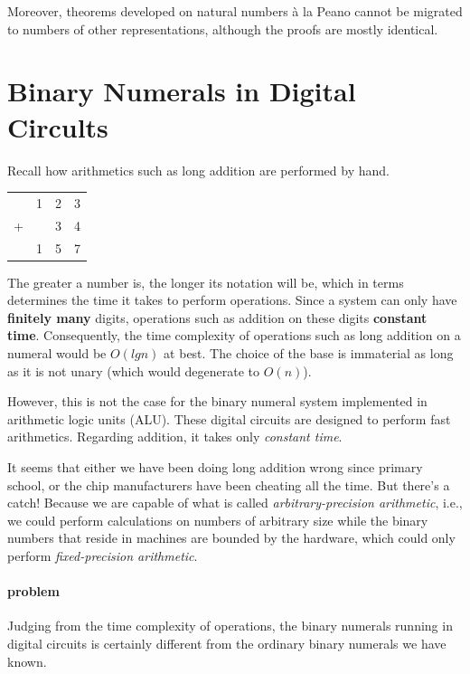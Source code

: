 \documentclass[\main/thesis.tex]{subfiles}
\begin{document}
Moreover, theorems developed on natural numbers à la Peano cannot be migrated
to numbers of other representations, although the proofs are mostly identical.

\section{Binary Numerals in Digital Circults}

Recall how arithmetics such as long addition are performed by hand.

\begin{center}
    \begin{tabular}{c@{\,}c@{\,}c@{\,}c}
      & 1 & 2 & 3 \\
    + &   & 3 & 4 \\
    \hline
      & 1 & 5 & 7 \\
    \end{tabular}
\end{center}
The greater a number is, the longer its notation will be, which in terms
determines the time it takes to perform operations.
Since a system can only have \textbf{finitely many} digits, operations such as
addition on these digits 
\textbf{constant time}.
Consequently, the time complexity of operations such as long addition on a
numeral would be $ O(lg n) $ at best.
The choice of the base is immaterial as long as it is not unary
(which would degenerate to $ O(n) $).

However, this is not the case for the binary numeral system implemented in
arithmetic logic units (ALU). These digital circuits are designed to perform
fast arithmetics. Regarding addition, it takes only \textit{constant time}.

It seems that either we have been doing long addition wrong since primary school,
or the chip manufacturers have been cheating all the time. But there's a catch!
Because we are capable of what is called \textit{arbitrary-precision arithmetic},
i.e., we could perform calculations on numbers of arbitrary size
while the binary numbers that reside in machines are bounded by the hardware,
which could only perform \textit{fixed-precision arithmetic}.

\paragraph{problem}
Judging from the time complexity of operations, the binary numerals running in
digital circuits is certainly different from the ordinary binary numerals we have
known.
\end{document}

